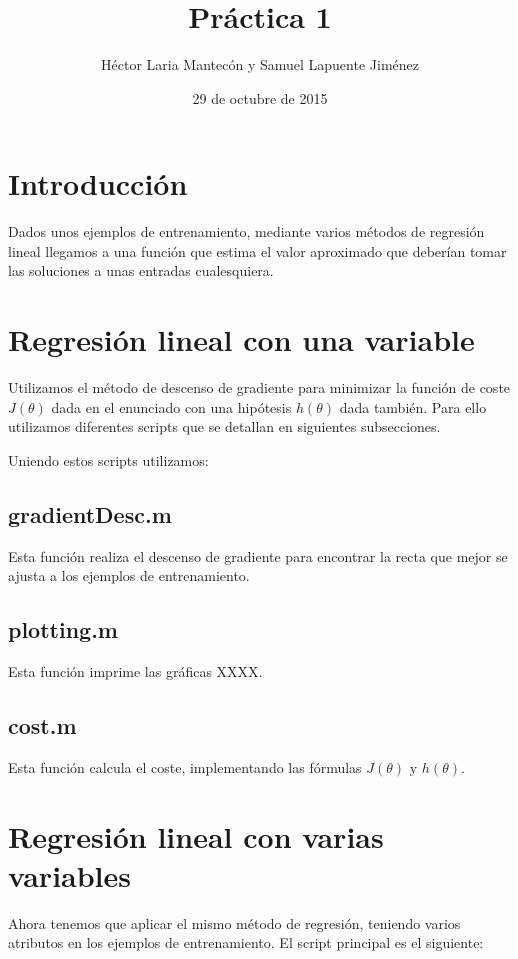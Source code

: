 \documentclass{article}
\title{Práctica 1}
\author{Héctor Laria Mantecón y Samuel Lapuente Jiménez}
\date{29 de octubre de 2015}
\begin{document}
\maketitle
\section{Introducción}
Dados unos ejemplos de entrenamiento, mediante varios métodos de regresión lineal llegamos a una función que estima el valor aproximado que deberían tomar las soluciones a unas entradas cualesquiera.

\section{Regresión lineal con una variable}
Utilizamos el método de descenso de gradiente para minimizar la función de coste $J(\theta)$ dada en el enunciado con una hipótesis $h(\theta)$ dada también. Para ello utilizamos diferentes scripts que se detallan en siguientes subsecciones.

Uniendo estos scripts utilizamos:

\pagebreak

\subsection{gradientDesc.m}
Esta función realiza el descenso de gradiente para encontrar la recta que mejor se ajusta a los ejemplos de entrenamiento.

\pagebreak %
\subsection{plotting.m}
Esta función imprime las gráficas XXXX.


\subsection{cost.m}
Esta función calcula el coste, implementando las fórmulas $J(\theta)$ y $h(\theta)$.


\section{Regresión lineal con varias variables}
Ahora tenemos que aplicar el mismo método de regresión, teniendo varios atributos en los ejemplos de entrenamiento. El script principal es el siguiente:

\end{document}
